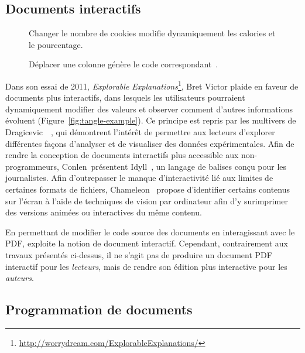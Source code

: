 \subsection{Documents interactifs}

\begin{wrapfigure}{r}{4cm}
    \center
    \caption{Changer le nombre de cookies modifie dynamiquement les calories et le pourcentage.}
    \label{fig:tangle-example}
    \bigskip\bigskip
    \caption{Déplacer une colonne génère le code correspondant~\cite{kery2020future}.}
    \label{fig:interactive-dataframe-exemple}
\end{wrapfigure}

Dans son essai de 2011, \emph{Explorable Explanations}\footnote{\url{http://worrydream.com/ExplorableExplanations/}}, Bret Victor plaide en faveur de documents plus interactifs, dans lesquels les utilisateurs pourraient dynamiquement modifier des valeurs et observer comment d'autres informations évoluent (Figure~\ref{fig:tangle-example}).
Ce principe est repris par les multivers de Dragicevic~\etal~\cite{dragicevic2019increasing}, qui démontrent l'intérêt de permettre aux lecteurs d'explorer différentes façons d'analyser et de visualiser des données expérimentales.
Afin de rendre la conception de documents interactifs plus accessible aux non-programmeurs, Conlen~\etal présentent Idyll~\cite{conlen2018idyll}, un langage de balises conçu pour les journalistes.
Afin d'outrepasser le manque d'interactivité lié aux limites de certaines formats de fichiers, Chameleon~\cite{masson2020chameleon} propose d'identifier certains contenus sur l'écran à l'aide de techniques de vision par ordinateur afin d'y surimprimer des versions animées ou interactives du même contenu.

En permettant de modifier le code source des documents en interagissant avec le PDF, \iLaTeX{} exploite la notion de document interactif.
Cependant, contrairement aux travaux présentés ci-dessus, il ne s'agit pas de produire un document PDF interactif pour les \emph{lecteurs}, mais de rendre son édition plus interactive pour les \emph{auteurs}.



\subsection{Programmation de documents}


